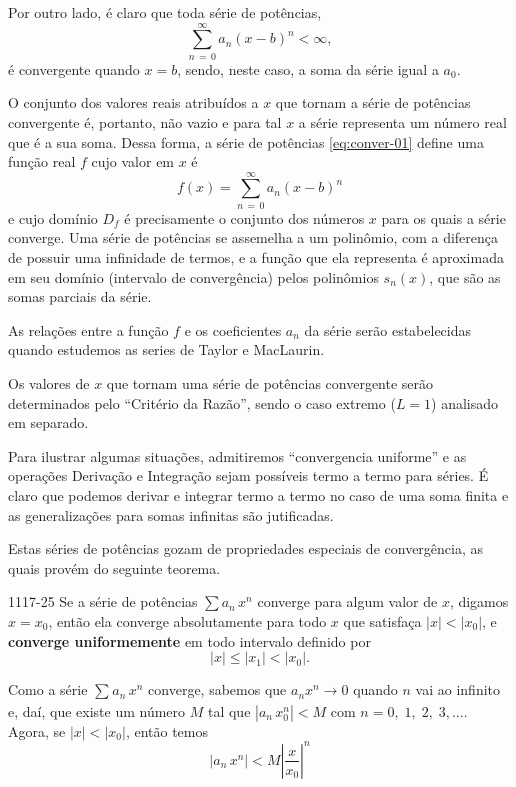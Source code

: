 Por outro lado, é claro que toda série de potências,
\begin{equation}\label{eq:conver-01}
  \sum_{n\, =\, 0}^{\infty}a_{n}(x-b)^{n} < \infty,
\end{equation}
é convergente quando \(x=b\), sendo, neste caso, a soma da série igual a \(a_{0}\). 

O conjunto dos valores reais atribuídos a \(x\) que tornam a série de potências convergente é, portanto, 
não vazio e para tal \(x\) a série representa um número real que é a sua soma. Dessa forma, 
a série de potências \eqref{eq:conver-01} define uma função real \(f\) cujo valor em \(x\) é 
\begin{equation*}
  f(x)=\sum_{n\, =\, 0}^{\infty}a_{n}(x-b)^{n}
\end{equation*}
e cujo domínio \(D_{f}\) é precisamente o conjunto dos números \(x\) para os quais a série converge. Uma 
série de potências se assemelha a um polinômio, com a diferença de possuir uma infinidade de termos, e 
a função que ela representa é aproximada em seu domínio (intervalo de convergência) pelos polinômios 
\(s_{n}(x)\), que são as somas parciais da série. 

As relações entre a função \(f\) e os coeficientes \(a_{n}\) da série serão estabelecidas quando estudemos as
series de Taylor e MacLaurin.

Os valores de \(x\) que tornam uma série de potências convergente serão determinados pelo ``Critério da
Razão'', sendo o caso extremo (\(L = 1\)) analisado em separado. 

Para ilustrar algumas situações, admitiremos ``convergencia uniforme'' e as operações Derivação e Integração sejam possíveis termo a termo para séries. É claro que podemos
derivar e integrar termo a termo no caso de uma soma finita e as generalizações para somas infinitas 
são jutificadas. 

Estas séries de potências gozam de propriedades especiais de convergência, as quais provém do
seguinte teorema.
\begin{theoc}{}{1117-25}
 Se a série de potências $\sum a_n\,x^n$ converge
para algum valor de $x$, digamos $x = x_{0}$, então ela converge
absolutamente para todo $x$ que satisfaça $|x| < |x_{0}|$, e
\textbf{converge uniformemente} em todo intervalo definido por
\begin{equation*}
|x|\leq |x_{1}|< |x_{0}|.
\end{equation*}
\end{theoc}

\prova Como a série $\sum_{}a_n\,x^{n}$ converge, sabemos
que $a_nx^n\to 0$ quando $n$ vai ao infinito e, daí, que existe um
número $M$ tal que $|a_{n}\,x_{0}^{n}|<M$ com $n=0,\; 1,\; 2,\; 3,\ldots$. Agora,
se $|x| <|x_{0}|$, então temos
\begin{equation*}
  |a_{n}\,x^{n}| < M\left|\dfrac{x}{x_{0}}\right|^{n}
\end{equation*}

